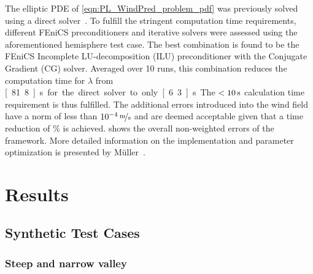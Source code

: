 \documentclass[twocolumn,letterpaper]{IEEEAerospaceCLS}
\begin{document}
The elliptic \ac{PDE} of \cref{eqn:PL_WindPred_problem_pdf} was previously solved using a direct solver~\cite{Walt2016}. To fulfill the stringent computation time requirements, different FEniCS preconditioners and iterative solvers were assessed using the aforementioned hemisphere test case. The best combination is found to be the FEniCS Incomplete LU-decomposition (ILU) preconditioner with the Conjugate Gradient (CG) solver. Averaged over 10 runs, this combination reduces the computation time for $\lambda$ from \unit[81.8]{s} for the direct solver to only \unit[6.3]{s}. The $<\unit[10]{s}$ calculation time requirement is thus fulfilled. The additional errors introduced into the wind field have a norm of less than $\unitfrac[10^{-4}]{m}{s}$ and are deemed acceptable given that a time reduction of \unit[92]{\%} is achieved.  shows the overall non-weighted errors of the framework. More detailed information on the implementation and parameter optimization is presented by M{\"u}ller~\cite{Mueller_MT_WindPrediction}.

\section{Results}
\label{sec:PL_WindPred_Results}

\subsection{Synthetic Test Cases}
\label{sec:PL_WindPred_PrelResults_Synthetic}

\subsubsection{Steep and narrow valley}
\label{sec:PL_WindPred_valley}
\end{document}
